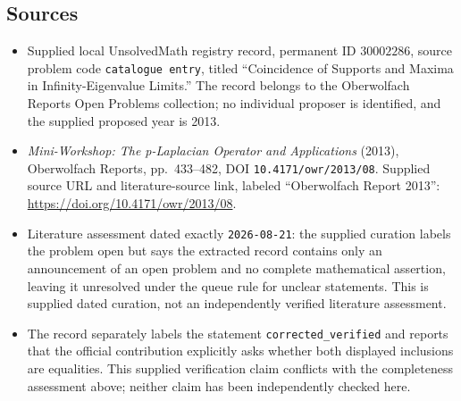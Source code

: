 \documentclass[11pt]{article}
\begin{document}
\subsection{Sources}
\begin{itemize}
\item Supplied local UnsolvedMath registry record, permanent ID \(30002286\), source problem code \texttt{catalogue entry}, titled ``Coincidence of Supports and Maxima in Infinity-Eigenvalue Limits.'' The record belongs to the Oberwolfach Reports Open Problems collection; no individual proposer is identified, and the supplied proposed year is 2013.
\item \emph{Mini-Workshop: The p-Laplacian Operator and Applications} (2013), Oberwolfach Reports, pp.~433--482, DOI \texttt{10.4171/owr/2013/08}. Supplied source URL and literature-source link, labeled ``Oberwolfach Report 2013'': \url{https://doi.org/10.4171/owr/2013/08}.
\item Literature assessment dated exactly \texttt{2026-08-21}: the supplied curation labels the problem open but says the extracted record contains only an announcement of an open problem and no complete mathematical assertion, leaving it unresolved under the queue rule for unclear statements. This is supplied dated curation, not an independently verified literature assessment.
\item The record separately labels the statement \texttt{corrected\_verified} and reports that the official contribution explicitly asks whether both displayed inclusions are equalities. This supplied verification claim conflicts with the completeness assessment above; neither claim has been independently checked here.
\end{itemize}
\end{document}
